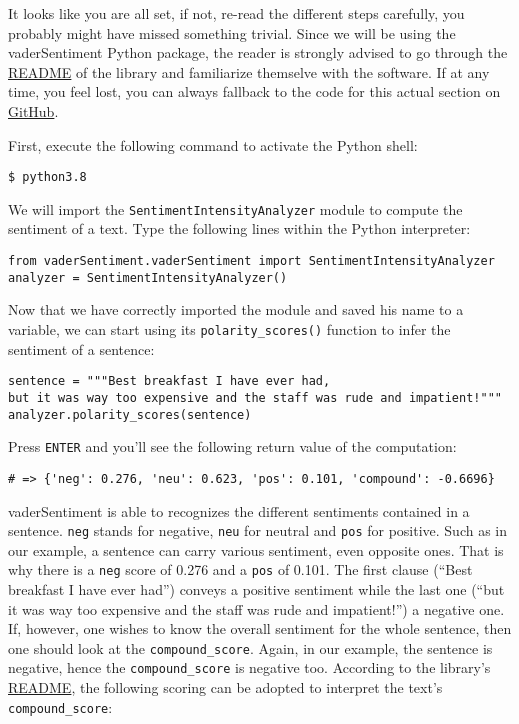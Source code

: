 	It looks like you are all set, if not, re-read the different steps carefully, you probably might have missed something trivial. Since we will be using the vaderSentiment Python package, the reader is strongly advised to go through the \href{https://github.com/cjhutto/vaderSentiment#vader-sentiment-analysis}{README} of the library and familiarize themselve with the software. If at any time, you feel lost, you can always fallback to the code for this actual section on \href{https://gist.github.com/ryanzidago/5440bcd66be55ba23ca9b55cf336bab6}{GitHub}.
	
	First, execute the following command to activate the Python shell:
	\begin{Verbatim}
$ python3.8
	\end{Verbatim}
	We will import the \verb|SentimentIntensityAnalyzer| module to compute the sentiment of a text. Type the following lines within the Python interpreter:
	\begin{Verbatim}
from vaderSentiment.vaderSentiment import SentimentIntensityAnalyzer
analyzer = SentimentIntensityAnalyzer()
	\end{Verbatim}
Now that we have correctly imported the module and saved his name to a variable, we can start using its \verb|polarity_scores()| function to infer the sentiment of a sentence:
	\begin{Verbatim}
sentence = """Best breakfast I have ever had, 
but it was way too expensive and the staff was rude and impatient!"""
analyzer.polarity_scores(sentence)
	\end{Verbatim}
	Press \verb|ENTER| and you'll see the following return value of the computation:
\begin{Verbatim}
# => {'neg': 0.276, 'neu': 0.623, 'pos': 0.101, 'compound': -0.6696}
\end{Verbatim}
	vaderSentiment is able to recognizes the different sentiments contained in a sentence. \verb|neg| stands for negative, \verb|neu| for neutral and \verb|pos| for positive. Such as in our example, a sentence can carry various sentiment, even opposite ones. That is why there is a \verb|neg| score of 0.276 and a \verb|pos| of 0.101. The first clause (``Best breakfast I have ever had'') conveys a positive sentiment while the last one (``but it was way too expensive and the staff was rude and impatient!'') a negative one. If, however, one wishes to know the overall sentiment for the whole sentence, then one should look at the \verb|compound_score|. Again, in our example, the sentence is negative, hence the \verb|compound_score| is negative too. According to the library's \href{https://github.com/cjhutto/vaderSentiment#about-the-scoring}{README}, the following scoring can be adopted to interpret the text's \verb|compound_score|: 
	
